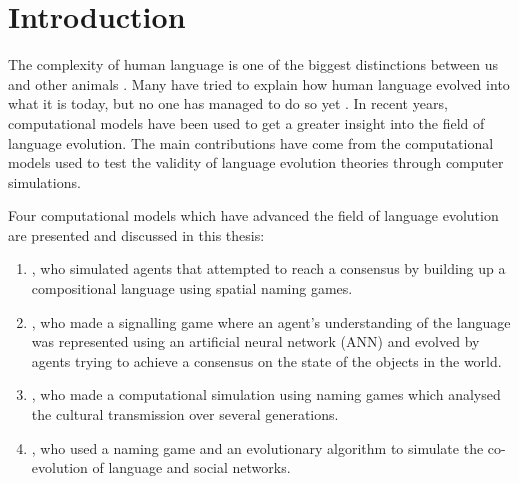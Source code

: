 \acresetall
\chapter{Introduction}
The complexity of human language is one of the biggest distinctions between us and other animals \citep{hauser2002faculty}. Many have tried to explain how human language evolved into what it is today, but no one has managed to do so yet \citep{chomsky1986knowledge, pinker1990natural, muller1861theoretical}. In recent years, computational models have been used to get a greater insight into the field of language evolution. The main contributions have come from the computational models used to test the validity of language evolution theories through computer simulations.

Four computational models which have advanced the field of language evolution are presented and discussed in this thesis: 
\begin{enumerate}
    \item \citeauthor{gong2011simulating}, who simulated agents that attempted to reach a consensus by building up a compositional language using spatial naming games.
    \item \citeauthor{munroe2002learning}, who made a signalling game where an agent's understanding of the language was represented using an artificial neural network (ANN) and evolved by agents trying to achieve a consensus on the state of the objects in the world.
    \item \citeauthor{lipowska2011naming}, who made a computational simulation using naming games which analysed the cultural transmission over several generations.
    \item \citeauthor{lekvam2014co}, who used a naming game and an evolutionary algorithm to simulate the co-evolution of language and social networks.
\end{enumerate}

